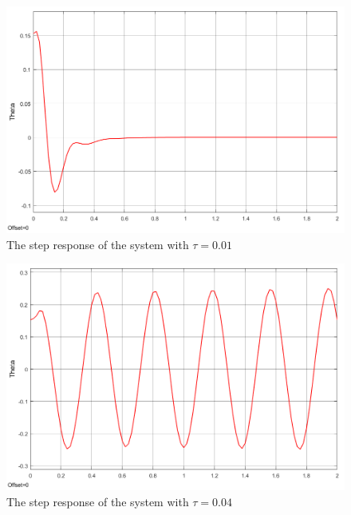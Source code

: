 \documentclass[a4paper,12pt,oneside,onecolumn]{article} %
\begin{document}
\begin{figure}[H]
    \centering
    \includegraphics[scale=0.5]{Task_14_01.png}
    \caption{The step response of the system with $\tau=0.01$}
    \label{fig:16}
\end{figure}

\begin{figure}[H]
    \centering
    \includegraphics[scale=0.5]{Task_14_04.png}
    \caption{The step response of the system with $\tau=0.04$}
    \label{fig:17}
\end{figure}
\end{document}
